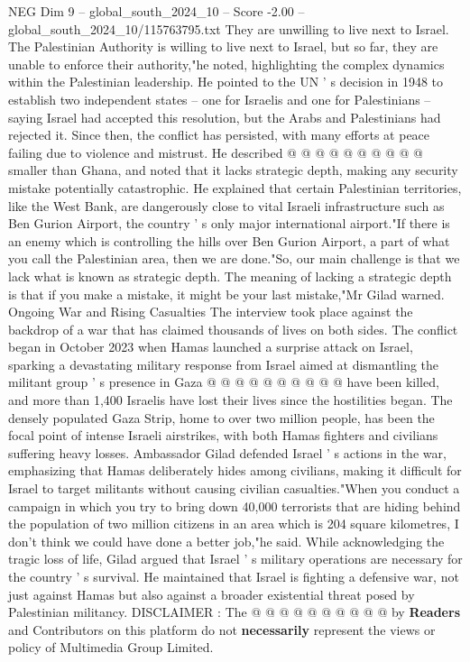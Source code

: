 \begin{textsample}{NEG Dim 9 – global\_south\_2024\_10 – Score -2.00 – global\_south\_2024\_10/115763795.txt}
They are unwilling to live next to Israel.
The Palestinian Authority is willing to live next to Israel, but so far, they are unable to enforce their authority,"he noted, highlighting the complex dynamics within the Palestinian leadership.
He pointed to the UN ' s decision in 1948 to establish two independent states -- one for Israelis and one for Palestinians -- saying Israel had accepted this resolution, but the Arabs and Palestinians had rejected it.
Since then, the conflict has persisted, with many efforts at peace failing due to violence and mistrust.
He described @ @ @ @ @ @ @ @ @ @ smaller than Ghana, and noted that it lacks strategic depth, making any security mistake potentially catastrophic.
He explained that certain Palestinian territories, like the West Bank, are dangerously close to vital Israeli infrastructure such as Ben Gurion Airport, the country ' s only major international airport."If there is an enemy which is controlling the hills over Ben Gurion Airport, a part of what you call the Palestinian area, then we are done."So, our main challenge is that we lack what is known as strategic depth.
The meaning of lacking a strategic depth is that if you make a mistake, it might be your last mistake,"Mr Gilad warned.
Ongoing War and Rising Casualties The interview took place against the backdrop of a war that has claimed thousands of lives on both sides.
The conflict began in October 2023 when Hamas launched a surprise attack on Israel, sparking a devastating military response from Israel aimed at dismantling the militant group ' s presence in Gaza @ @ @ @ @ @ @ @ @ @ have been killed, and more than 1,400 Israelis have lost their lives since the hostilities began.
The densely populated Gaza Strip, home to over two million people, has been the focal point of intense Israeli airstrikes, with both Hamas fighters and civilians suffering heavy losses.
Ambassador Gilad defended Israel ' s actions in the war, emphasizing that Hamas deliberately hides among civilians, making it difficult for Israel to target militants without causing civilian casualties."When you conduct a campaign in which you try to bring down 40,000 terrorists that are hiding behind the population of two million citizens in an area which is 204 square kilometres, I don't think we could have done a better job,"he said.
While acknowledging the tragic loss of life, Gilad argued that Israel ' s military operations are necessary for the country ' s survival.
He maintained that Israel is fighting a defensive war, not just against Hamas but also against a broader existential threat posed by Palestinian militancy.
DISCLAIMER : The @ @ @ @ @ @ @ @ @ @ by \textbf{Readers} and Contributors on this platform do not \textbf{necessarily} represent the views or policy of Multimedia Group Limited.

\end{textsample}
